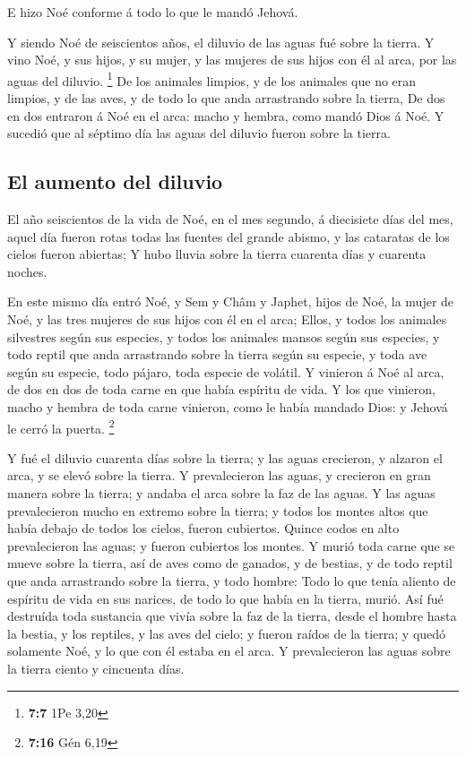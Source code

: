 E hizo Noé conforme á todo lo que le mandó Jehová.

 Y siendo Noé de seiscientos años, el diluvio de las aguas
fué sobre la tierra.  Y vino Noé, y sus hijos, y su mujer,
y las mujeres de sus hijos con él al arca, por las aguas del diluvio.
\footnote{\textbf{7:7} 1Pe 3,20}  De los animales limpios,
y de los animales que no eran limpios, y de las aves, y de todo lo que
anda arrastrando sobre la tierra,  De dos en dos entraron
á Noé en el arca: macho y hembra, como mandó Dios á Noé. 
Y sucedió que al séptimo día las aguas del diluvio fueron sobre la
tierra.

\hypertarget{el-aumento-del-diluvio}{%
\subsection{El aumento del diluvio}\label{el-aumento-del-diluvio}}

 El año seiscientos de la vida de Noé, en el mes segundo,
á diecisiete días del mes, aquel día fueron rotas todas las fuentes del
grande abismo, y las cataratas de los cielos fueron abiertas;
 Y hubo lluvia sobre la tierra cuarenta días y cuarenta
noches.

 En este mismo día entró Noé, y Sem y Châm y Japhet,
hijos de Noé, la mujer de Noé, y las tres mujeres de sus hijos con él en
el arca;  Ellos, y todos los animales silvestres según
sus especies, y todos los animales mansos según sus especies, y todo
reptil que anda arrastrando sobre la tierra según su especie, y toda ave
según su especie, todo pájaro, toda especie de volátil. 
Y vinieron á Noé al arca, de dos en dos de toda carne en que había
espíritu de vida.  Y los que vinieron, macho y hembra de
toda carne vinieron, como le había mandado Dios: y Jehová le cerró la
puerta. \footnote{\textbf{7:16} Gén 6,19}

 Y fué el diluvio cuarenta días sobre la tierra; y las
aguas crecieron, y alzaron el arca, y se elevó sobre la tierra.
 Y prevalecieron las aguas, y crecieron en gran manera
sobre la tierra; y andaba el arca sobre la faz de las aguas.
 Y las aguas prevalecieron mucho en extremo sobre la
tierra; y todos los montes altos que había debajo de todos los cielos,
fueron cubiertos.  Quince codos en alto prevalecieron las
aguas; y fueron cubiertos los montes.  Y murió toda carne
que se mueve sobre la tierra, así de aves como de ganados, y de bestias,
y de todo reptil que anda arrastrando sobre la tierra, y todo hombre:
 Todo lo que tenía aliento de espíritu de vida en sus
narices, de todo lo que había en la tierra, murió.  Así
fué destruída toda sustancia que vivía sobre la faz de la tierra, desde
el hombre hasta la bestia, y los reptiles, y las aves del cielo; y
fueron raídos de la tierra; y quedó solamente Noé, y lo que con él
estaba en el arca.  Y prevalecieron las aguas sobre la
tierra ciento y cincuenta días.

